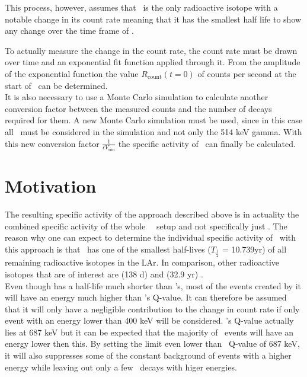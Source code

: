 \documentclass[encoding=utf8,british]{tumphthesis}
\begin{document}
This process, however, assumes that \Kr\ is the only radioactive isotope with a notable change in its count rate meaning that it has the smallest half life to show any change over the time frame of \PII.




To actually measure the change in the count rate, the count rate must be drawn over time and an exponential fit function applied through it.
From the amplitude of the exponential function the value $R_{\mathrm{count}}(t=0)$ of counts per second at the start of \PII\ can be determined.
\\

It is also necessary to use a Monte Carlo simulation to calculate another conversion factor between the measured counts and the number of decays required for them. 
A new Monte Carlo simulation must be used, since in this case all \Kr\ must be considered in the simulation and not only the 514 keV gamma.
With this new conversion factor $\frac{1}{\epsilon V_{\mathrm{sim}}}$ the specific activity of \Kr\ can finally be calculated.

\section{Motivation}
\label{sec:motivation}
The resulting specific activity of the approach described above is in actuality the combined specific activity of the whole \gerda\ \PII\ setup and not specifically just \Kr.
The reason why one can expect to determine the individual specific activity of \Kr\ with this approach is that \Kr\ has one of the smallest half-lives ($T_{\frac{1}{2}}$ = 10.739\unit{yr}) of all remaining radioactive isotopes in the LAr. 
In comparison, other radioactive isotopes that are of interest are  (138 d)\cite{kondev_nuclear_2008} and  (32.9 yr) \cite{chen_nuclear_2016} .
\\

Even though  has a half-life much shorter than \Kr's, most of the events created by it will have an energy much higher than \Kr's Q-value.
It can therefore be assumed that it will only have a negligible contribution to the change in count rate if only event with an energy lower than 400 keV will be considered.
\Kr's Q-value actually lies at 687 keV but it can be expected that the majority of \Kr\ events will have an energy lower then this.
By setting the limit even lower than \Kr\ Q-value of 687 keV, it will also suppresses some of the constant background of events with a higher energy while leaving out only a few \Kr\ decays with higer energies.
\\
\end{document}
